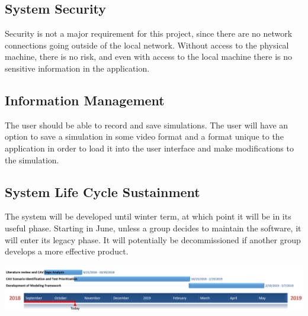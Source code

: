 \documentclass[10pt,letterpaper,draftclsnofoot,onecolumn]{IEEEtran}
\begin{document}
	\subsection{System Security}
	Security is not a major requirement for this project, since there are no network connections going outside of the local network. Without access to the physical machine, there is no risk, and even with access to the local machine there is no sensitive information in the application.
	\subsection{Information Management}
	The user should be able to record and save simulations. The user will have an option to save a simulation in some video format and a format unique to the application in order to load it into the user interface and make modifications to the simulation.
	\subsection{System Life Cycle Sustainment}
	The system will be developed until winter term, at which point it will be in its useful phase. Starting in June, unless a group decides to maintain the software, it will enter its legacy phase. It will potentially be decommissioned if another group develops a more effective product.

\includegraphics[width=6.5in]{gantt_chart}
\end{document}
